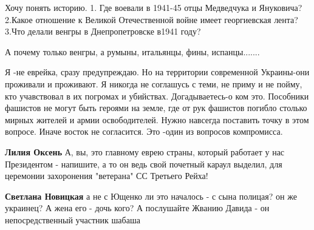 \begin{itemize}
Хочу понять историю. 1. Где воевали в 1941-45 отцы Медведчука и Януковича?
2.Какое отношение к Великой Отечественной войне имеет георгиевская лента? 3.Что
делали венгры в Днепропетровске в1941 году?

\begin{itemize}
 
А почему только венгры, а румыны, итальянцы, фины, испанцы.......
\end{itemize}

 

Я -не еврейка, сразу предупреждаю. Но на территории современной Украины-они
проживали и проживают. Я никогда не соглашусь с теми, не приму и не пойму, кто
учавствовал в их погромах и убийствах. Догадываетесь-о ком это. Пособники
фашистов не могут быть героями на земле, где от рук фашистов погибло столько
мирных жителей и армии освободителей. Нужно навсегда поставить точку в этом
вопросе. Иначе восток не согласится. Это -один из вопросов компромисса.

\begin{itemize}
 
\textbf{Лилия Оксень} А, вы, это главному еврею страны, который работает у нас
Президентом - напишите, а то он ведь свой почетный караул выделил, для
церемонии захоронения "ветерана" СС Третьего Рейха!

 
\textbf{Светлана Новицкая} а не с Ющенко ли это началось - с сына полицая? он же
украинец? А жена его - дочь кого? А послушайте Жванию Давида - он непосредственный
участник шабаша


\end{itemize}
\end{itemize}
